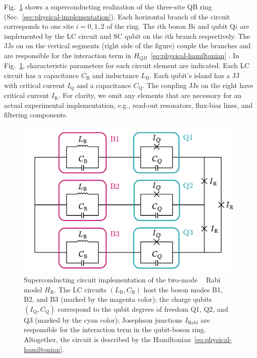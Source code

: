 \documentclass[reprint, aps, prx, amsmath, amssymb, longbibliography, superscriptaddress]{revtex4-2}
\DeclareMathOperator{\Zthree}{\mathbb{Z}_3}
\begin{document}
Fig.~\ref{fig:superconducting-Rabi} shows a superconducting realization of the three‑site QB ring (Sec.~\ref{sec:physical-implementation}). Each horizontal branch of the circuit corresponds to one site $i = 0,1,2$ of the ring. The $i$th boson $\mathrm{B}i$ and qubit $\mathrm{Q}i$ are implemented by the LC circuit and SC qubit on the $i$th branch respectively. The JJs on on the vertical  segments  (right side of the figure) couple the branches and are responsible for the interaction term in $H_{QB}$~\eqref{eq:physical-hamiltonian} \cite{siewert_aspects_2000,rasmussen_controllable_2019,shafranjuk_twoqubit_2006,allman_tunable_2014,hu_controllable_2007}. In Fig.~\ref{fig:superconducting-Rabi}, characteristic parameters for each circuit element are indicated. Each LC circuit has a capacitance $C_{\text{B}}$ and inductance $L_{\text{B}}$. Each qubit's island has a JJ with critical current $I_{\text{Q}}$ and a capacitance $C_{\text{Q}}$. The coupling JJs on the right have critical current $I_{\text{R}}$. For clarity, we omit any elements that are necessary for an actual experimental implementation, e.g., read‑out resonators, flux‑bias lines, and filtering components.

\begin{figure}[t]
  \includegraphics[width=\linewidth]{pics/SC_Rabi_circuit_with_contours.pdf}
  \caption{Superconducting circuit implementation of the two-mode $\Zthree$ Rabi model $H_{\text{R}}$. The LC circuits $(L_{\text{B}}, C_{\text{B}})$ host the boson modes B1, B2, and B3 (marked by the magenta color); the charge qubits $(I_{\text{Q}}, C_{\text{Q}})$ correspond to the qubit degrees of freedom Q1, Q2, and Q3 (marked by the cyan color); Josephson junctions $I_{\text{Rabi}}$ are responsible for the interaction term in the qubit-boson ring. Altogether, the circuit is described by the Hamiltonian~\eqref{eq:physical-hamiltonian}.}
  \label{fig:superconducting-Rabi}
\end{figure}
\end{document}
